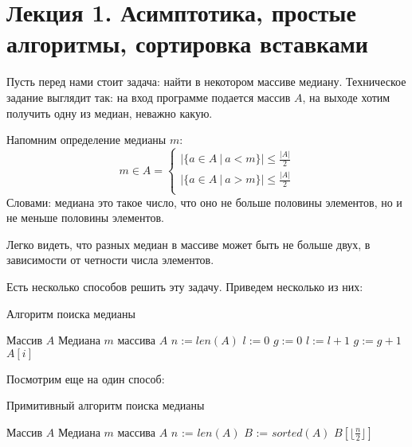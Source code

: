 \documentclass[../book.tex]{subfiles}
\begin{document}
	\section{Лекция 1. Асимптотика, простые алгоритмы, сортировка вставками}
	
	Пусть перед нами стоит задача: найти в некотором массиве медиану. Техническое задание выглядит так: на вход программе подается массив $A$, на выходе хотим получить одну из медиан, неважно какую.
	
	Напомним определение медианы $m$:
	\[
	m \in A = 
	\begin{cases}
		|\{ a \in A \ | \ a < m \}| \leqslant \frac{|A|}{2} \\
		|\{ a \in A \ | \ a > m \}| \leqslant \frac{|A|}{2} \\
	\end{cases}
	\]
	Словами: медиана это такое число, что оно не больше половины элементов, но и не меньше половины элементов.
	
	Легко видеть, что разных медиан в массиве может быть не больше двух, в зависимости от четности числа элементов.
	
	Есть несколько способов решить эту задачу. Приведем несколько из них:
	
	\begin{algorithm}
		\caption{Алгоритм поиска медианы}
		\begin{algorithmic}[1]
			\Require Массив $A$
			\Ensure Медиана $m$ массива $A$
				\State $n := len(A)$
					\State $l := 0$
					\State $g := 0$
							\State $l := l + 1$
							\State $g := g + 1$
						\EndIf
					\EndFor
					\State \Return $A[i]$
				\EndIf
				\EndFor
			\EndFunction
		\end{algorithmic}
	\end{algorithm}
	
	

	
	Посмотрим еще на один способ:
	
	\begin{algorithm}
		\caption{Примитивный алгоритм поиска медианы}
		\begin{algorithmic}[1]
			\Require Массив $A$
			\Ensure Медиана $m$ массива $A$
			\Function{Median}{$A$}
				\State $n$ := $len(A)$
				\State $B$ := $sorted(A)$
				\State \Return $B[\lfloor\frac{n}{2}\rfloor]$
			\EndFunction
		\end{algorithmic}
	\end{algorithm}
	
\end{document}
